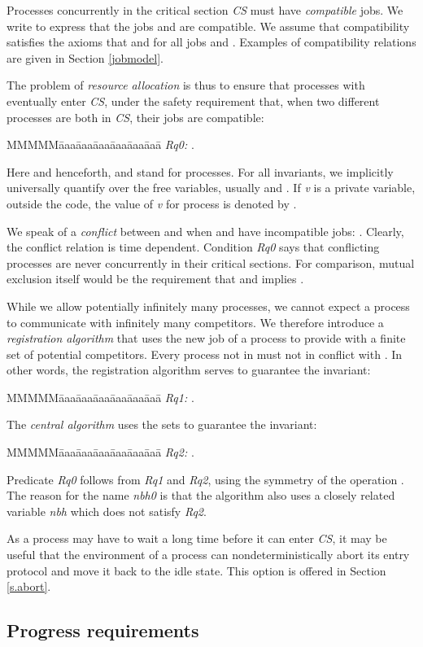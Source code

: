 \documentclass[10pt]{article} \usepackage[english]{babel}
\newenvironment{tab}{\begin{tabbing}
MMMMM\=aaa\=aaa\=aaa\=aaa\=aaa\=aaa\= \kill}{\end{tabbing}}
\def\S #1/{\mbox {\textsl{#1}}}
\begin{document}
Processes concurrently in the critical section \S CS/ must have
\emph{compatible} jobs.  We write  to express that the jobs 
and  are compatible.  We assume that compatibility satisfies the
axioms that  and  for all jobs
 and .  Examples of compatibility relations are given in Section
\ref{jobmodel}.

The problem of \emph{resource allocation} is thus to ensure that
processes with  eventually enter \S CS/, under
the safety requirement that, when two different processes are both in
\S CS/, their jobs are compatible:
\begin{tab}
\S Rq0:/ \>  .
\end{tab}
Here and henceforth,  and  stand for processes.  For all
invariants, we implicitly universally quantify over the free
variables, usually  and .  If \S v/ is a private variable,
outside the code, the value of \S v/ for process  is denoted by .

We speak of a \emph{conflict} between  and  when  and 
have incompatible jobs: .
Clearly, the conflict relation is time dependent.  Condition \S Rq0/
says that conflicting processes are never concurrently in their
critical sections.  For comparison, mutual exclusion itself would be
the requirement that  and  implies
.

While we allow potentially infinitely many processes, we cannot expect
a process to communicate with infinitely many competitors.  We
therefore introduce a \emph{registration algorithm} that uses the new
job of a process  to provide  with a finite set  of
potential competitors.  Every process not in  must not in
conflict with .  In other words, the registration algorithm serves
to guarantee the invariant:
\begin{tab}
\S Rq1:/ \>  .
\end{tab}
The \emph{central algorithm} uses the sets  to guarantee
the invariant:
\begin{tab}
\S Rq2:/ \>  .
\end{tab}
Predicate \S Rq0/ follows from \S Rq1/ and \S Rq2/, using the symmetry
of the operation .  The reason for the name \S nbh0/ is that the
algorithm also uses a closely related variable \S nbh/ which does not
satisfy \S Rq2/.

As a process may have to wait a long time before it can enter \S CS/,
it may be useful that the environment of a process can
nondeterministically abort its entry protocol and move it back to the
idle state.  This option is offered in Section \ref{s.abort}.

\subsection{Progress requirements} \label{progress}
\end{document}
